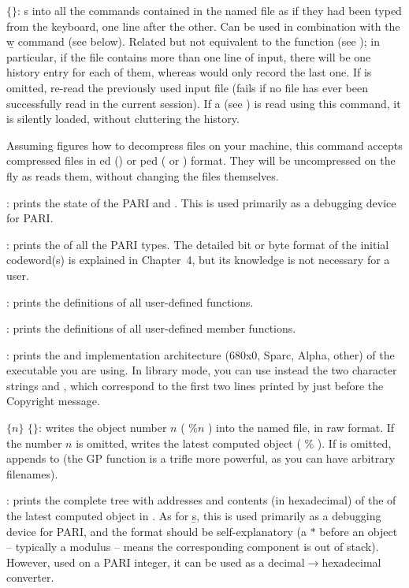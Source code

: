  $\{$$\}$: s into  all the
commands contained in the named file as if they had been typed from the
keyboard, one line after the other. Can be used in combination with the \b{w}
command (see below). Related but not equivalent to the function 
(see ); in particular, if the file contains more than one
line of input, there will be one history entry for each of them, whereas
 would only record the last one. If  is omitted,
re-read the previously used input file (fails if no file has ever been
successfully read in the current session). If a  
(see ) is read using this command, it is silently loaded,
without cluttering the history.

Assuming  figures how to decompress files on your machine, this
command accepts compressed files in ed () or
ped ( or ) format. They will be uncompressed on
the fly as  reads them, without changing the files themselves.

: prints the state of the PARI  and .
This is used primarily as a debugging device for PARI.

: prints the  of all the PARI
types. The detailed bit or byte format of the initial codeword(s) is
explained in Chapter~4, but its knowledge is not necessary for a  user.

: prints the definitions of all user-defined functions.

: prints the definitions of all user-defined member functions.

: prints the  and implementation architecture
(680x0, Sparc, Alpha, other) of the  executable you are using. In library
mode, you can use instead the two character strings  and
, which correspond to the first two lines printed by  just
before the Copyright message.

 $\{n\}$ $\{$$\}$: writes the object number
$n$ ( $\%n$ ) into the named file, in raw format. If the number $n$ is
omitted, writes the latest computed object ( $\%$ ). If  is
omitted, appends to  (the GP function  is a trifle more
powerful, as you can have arbitrary filenames).

: prints the complete tree with addresses and contents (in
hexadecimal) of the  of the latest computed
object in . As for \b{s}, this is used primarily as a debugging device for
PARI, and the format should be self-explanatory (a $*$ before an object --
typically a modulus -- means the corresponding component is out of stack).
However, used on a PARI integer, it can be used as a
decimal$\rightarrow$hexadecimal converter.

